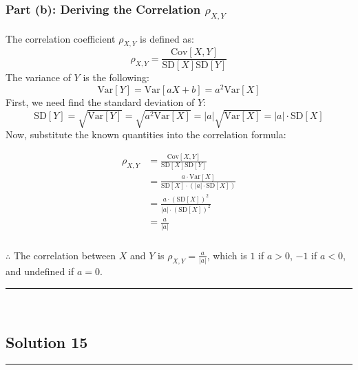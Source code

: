 \documentclass{article}
\begin{document}
\subsubsection*{Part (b): Deriving the Correlation $\rho_{X, Y}$}
\parbox{\textwidth}{
The correlation coefficient $\rho_{X, Y}$ is defined as:
$$\rho_{X, Y} = \frac{\text{Cov}[X, Y]}{\text{SD}[X]\text{SD}[Y]}$$
The variance of $Y$ is the following:
$$ \text{Var}[Y] = \text{Var}[aX + b] = a^2 \text{Var}[X] $$
First, we need find the standard deviation of $Y$:
$$ \text{SD}[Y] = \sqrt{\text{Var}[Y]} = \sqrt{a^2 \text{Var}[X]} = |a|\sqrt{\text{Var}[X]} = |a| \cdot \text{SD}[X] $$
Now, substitute the known quantities into the correlation formula:
}
\begin{align*}
\rho_{X, Y} &= \frac{\text{Cov}[X, Y]}{\text{SD}[X]\text{SD}[Y]} \\
&= \frac{a \cdot \text{Var}[X]}{\text{SD}[X] \cdot (|a| \cdot \text{SD}[X])} \\
&= \frac{a \cdot (\text{SD}[X])^2}{|a| \cdot (\text{SD}[X])^2} \\
&= \frac{a}{|a|} 
\end{align*}

\subsubsection*{\normalfont}{$\therefore$ The correlation between $X$ and $Y$ is $\rho_{X, Y} = \frac{a}{|a|}$, which is $1$ if $a>0$, $-1$ if $a<0$, and undefined if $a=0$.}


\noindent\rule{\textwidth}{0.4pt}\\

\newpage

\subsection*{Solution 15}
\noindent\rule{\textwidth}{0.4pt}\\
\vspace{1em}
\end{document}
